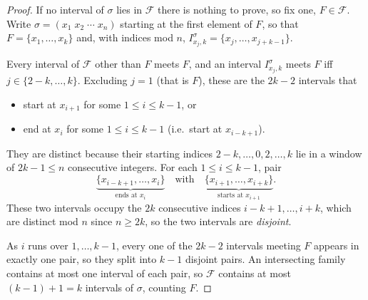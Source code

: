 \begin{proof}
    If no interval of \(\sigma\) lies in \(\mathcal{F}\) there is nothing to prove, so fix one, \(F \in \mathcal{F}\). Write \(\sigma = (x_1 \; x_2 \; \cdots \; x_n)\) starting at the first element of \(F\), so that \(F = \{x_1, \ldots, x_k\}\) and, with indices mod \(n\), \(I_{x_j,k}^\sigma = \{x_j, \ldots, x_{j+k-1}\}\).

    Every interval of \(\mathcal{F}\) other than \(F\) meets \(F\), and an interval \(I_{x_j,k}^\sigma\) meets \(F\) iff \(j \in \{2-k, \ldots, k\}\). Excluding \(j = 1\) (that is \(F\)), these are the \(2k-2\) intervals that
    \begin{itemize}
        \item start at \(x_{i+1}\) for some \(1 \le i \le k-1\), or
        \item end at \(x_i\) for some \(1 \le i \le k-1\) (i.e.\ start at \(x_{i-k+1}\)).
    \end{itemize}
    They are distinct because their starting indices \(2-k, \ldots, 0, 2, \ldots, k\) lie in a window of \(2k-1 \le n\) consecutive integers. For each \(1 \le i \le k-1\), pair
    \[
        \underbrace{\{x_{i-k+1}, \ldots, x_i\}}_{\text{ends at } x_i}
        \quad \text{with} \quad
        \underbrace{\{x_{i+1}, \ldots, x_{i+k}\}}_{\text{starts at } x_{i+1}}.
    \]
    These two intervals occupy the \(2k\) consecutive indices \(i-k+1, \ldots, i+k\), which are distinct mod \(n\) since \(n \ge 2k\), so the two intervals are \emph{disjoint}.
    \begin{center}
    \end{center}
    As \(i\) runs over \(1, \ldots, k-1\), every one of the \(2k-2\) intervals meeting \(F\) appears in exactly one pair, so they split into \(k-1\) disjoint pairs. An intersecting family contains at most one interval of each pair, so \(\mathcal{F}\) contains at most \((k-1) + 1 = k\) intervals of \(\sigma\), counting \(F\).
\end{proof}

